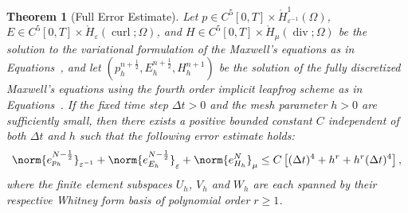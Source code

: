 \documentclass{amsart}
\theoremstyle{thmstyleone}%
\newtheorem{theorem}{Theorem}%
\theoremstyle{thmstyletwo}%
\theoremstyle{thmstylethree}%
\DeclareMathOperator{\curl}{curl}
\def\divgn{\operatorname{div}}
\begin{document}
\begin{theorem}[Full Error Estimate]\label{thm:full_error_estmt_lf4}
Let $p \in C^5[0, T] \times \mathring{H}^1_{\varepsilon^{-1}}(\Omega)$, $E \in C^5[0, T] \times \mathring{H}_{\varepsilon}(\curl; \Omega)$, and $H \in C^5[0, T] \times \mathring{H}_{\mu}(\divgn; \Omega)$ be the solution to the variational formulation of the Maxwell's equations as in Equations~, and let $(p_h^{n + \frac{1}{2}}, E_h^{n + \frac{1}{2}}, H_h^{n + 1})$ be the solution of the fully discretized Maxwell's equations using the fourth order implicit leapfrog scheme as in Equations~. If the fixed time step $\Delta t > 0$ and the mesh parameter $h > 0$ are sufficiently small, then there exists a positive bounded constant $C$ independent of both $\Delta t$ and $h$ such that the following error estimate holds:
\[
  \norm{e_{p_h}^{N - \frac{1}{2}}}_{\varepsilon^{-1}} + \norm{e_{E_h}^{N - \frac{1}{2}}}_{\varepsilon} + \norm{e_{H_h}^N}_{\mu} \le C \left[ (\Delta t)^4 + h^r + h^r (\Delta t)^4 \right],
\]
where the finite element subspaces $U_h$, $V_h$ and $W_h$ are each spanned by their respective Whitney form basis of polynomial order $r \ge 1$.
\end{theorem}
\end{document}

